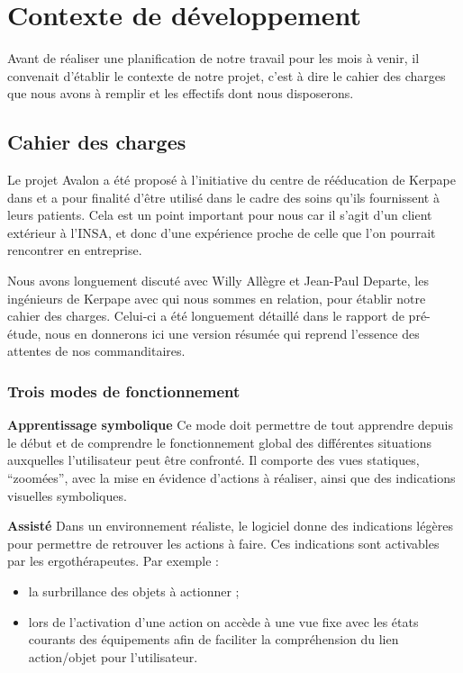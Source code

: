 \section{Contexte de développement}

Avant de réaliser une planification de notre travail pour les mois à venir, il convenait d'établir le contexte de notre projet, c'est à dire le cahier des charges que nous avons à remplir et  les effectifs dont nous disposerons.

\subsection{Cahier des charges}

Le projet Avalon a été proposé à l'initiative du centre de rééducation de Kerpape dans et a pour finalité d'être utilisé dans le cadre des soins qu'ils fournissent à leurs patients. Cela est un point important pour nous car il s'agit d'un client extérieur à l'INSA, et donc d'une expérience proche de celle que l'on pourrait rencontrer en entreprise. \newline

Nous avons longuement discuté avec Willy Allègre et Jean-Paul Departe, les ingénieurs de Kerpape avec qui nous sommes en relation, pour établir notre cahier des charges. Celui-ci a été longuement détaillé dans le rapport de pré-étude, nous en donnerons ici une version résumée qui reprend l'essence des attentes de nos commanditaires. 

\subsubsection{Trois modes de fonctionnement}

\textbf{Apprentissage symbolique}
\newline
Ce mode doit permettre de tout apprendre depuis le début et de comprendre le fonctionnement global des différentes situations auxquelles l'utilisateur peut être confronté. Il comporte des vues statiques, \enquote{zoomées}, avec la mise en évidence d'actions à réaliser, ainsi que des indications visuelles symboliques.\newline

\textbf{Assisté}
\newline
Dans un environnement réaliste, le logiciel donne des indications légères pour permettre de retrouver les actions à faire. Ces indications sont activables par les ergothérapeutes. Par exemple :
\begin{itemize}
  \item la surbrillance des objets à actionner ;
  \item lors de l'activation d'une action on accède à une vue fixe avec les états courants des équipements afin de faciliter la compréhension du lien action/objet pour l'utilisateur. \newline
\end{itemize}

